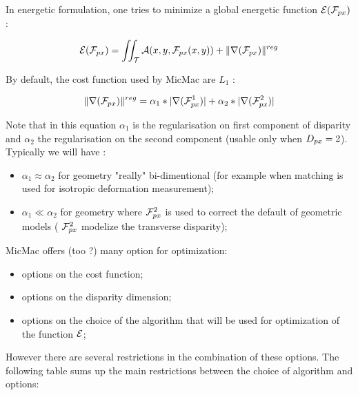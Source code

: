 In energetic formulation, one tries to minimize a global energetic function $\Energ(\FPx)$  :

\begin{equation}
   \Energ(\FPx) = \iint_\ETer \Ress(x,y,\FPx(x,y)) + \| \nabla(\FPx) \|^{reg}
\end{equation}


By default, the cost function used by MicMac are $L_1$  :

\begin{equation}
\label{CostGrad:Lun:DDeux}
   \| \nabla(\FPx) \|^{reg} = \alpha_1*|\nabla(\FPx^1)|+\alpha_2*|\nabla(\FPx^2)|
\end{equation}


Note that in this equation $\alpha_1$ is the regularisation on first
component of disparity and $\alpha_2$ the regularisation  on the
second component (usable only when $\DimPx=2$). Typically we will have :

\begin{itemize}
   \item $\alpha_1 \approx \alpha_2$ for geometry "really" bi-dimentional
         (for example when matching is used for isotropic deformation  measurement);

   \item $\alpha_1 \ll \alpha_2$ for geometry where  $\FPx^2$ is used to correct
         the default of geometric models ( $\FPx^2$ modelize the transverse disparity);

\end{itemize}



MicMac offers (too ?) many option for optimization:

\begin{itemize}
    \item  options on the cost function;
    \item  options on the  disparity dimension;
    \item  options  on the choice of the algorithm that will be used
           for optimization of the function  $\Energ$;
\end{itemize}

However there are several restrictions in the combination of these options.
The following table sums up the main restrictions between the choice of algorithm
and options:


